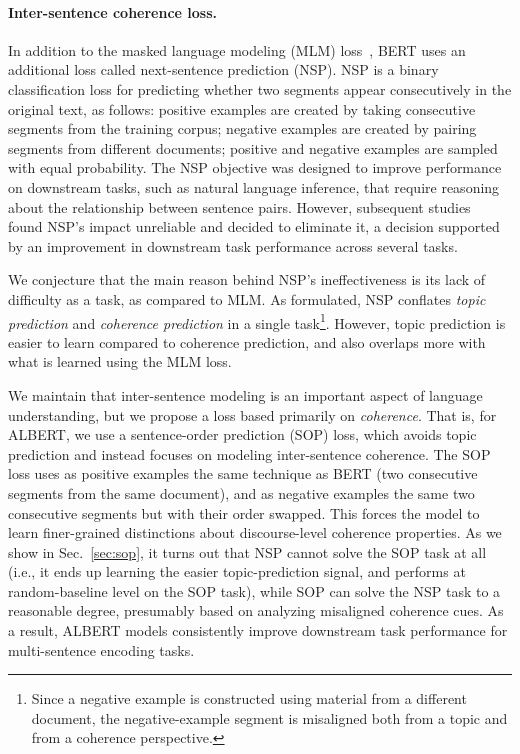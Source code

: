 \paragraph{Inter-sentence coherence loss.}
In addition to the masked language modeling (MLM) loss~\citep{devlin2018bert}, BERT uses an additional loss called next-sentence prediction (NSP).
NSP is a binary classification loss for predicting whether two segments appear consecutively in the original text, as follows:
positive examples are created by taking consecutive segments from the training corpus;
negative examples are created by pairing segments from different documents;
positive and negative examples are sampled with equal probability.
The NSP objective was designed to improve performance on downstream tasks, such as natural language inference, that require reasoning about the relationship between sentence pairs. 
However, subsequent studies~\citep{yang2019xlnet,liu2019roberta} found NSP's impact unreliable and decided to eliminate it, a decision supported by an improvement in downstream task performance across several tasks.

We conjecture that the main reason behind NSP's ineffectiveness is its lack of difficulty as a task, as compared to MLM.
As formulated, NSP conflates {\em topic prediction} and {\em coherence prediction} in a single task\footnote{Since a negative example is constructed using material from a different document, the negative-example segment is misaligned both from a topic and from a coherence perspective.}.
However, topic prediction is easier to learn compared to coherence prediction, and also overlaps more with what is learned using the MLM loss.

We maintain that inter-sentence modeling is an important aspect of language understanding, but we propose a loss based primarily on {\em coherence}. 
That is, for ALBERT, we use a sentence-order prediction (SOP) loss, which avoids topic prediction and instead focuses on modeling inter-sentence coherence.
The SOP loss uses as positive examples the same technique as BERT (two consecutive segments from the same document), and as negative examples the same two consecutive segments but with their order swapped.
This forces the model to learn finer-grained distinctions about discourse-level coherence properties.
As we show in Sec.~\ref{sec:sop}, it turns out that NSP cannot solve the SOP task at all (i.e., it ends up learning the easier topic-prediction signal, and performs at random-baseline level on the SOP task), while SOP can solve the NSP task to a reasonable degree, presumably based on analyzing misaligned coherence cues. 
As a result, ALBERT models consistently improve downstream task performance for multi-sentence encoding tasks.

